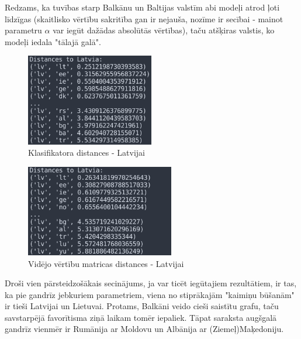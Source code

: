 \documentclass[12pt, a4paper]{article}
\begin{document}
Redzams, ka tuvības starp Balkānu un Baltijas valstīm abi modeļi atrod ļoti līdzīgas (skaitlisko vērtību sakritība gan ir nejauša, nozīme ir secībai - mainot parametru $\alpha$ var iegūt dažādas absolūtās vērtības), taču atšķiras valstis, ko modeļi iedala "tālajā galā".

\begin{figure}[h!]
    \centering
    \includegraphics[height=4cm,page=1]{close-far-lv-classifier.png}
    \caption{Klasifikatora distances - Latvijai}
\end{figure}
\begin{figure}[h!]
    \centering
    \includegraphics[height=4cm,page=1]{close-far-lv-model.png}
    \caption{Vidējo vērtību matricas distances - Latvijai}
\end{figure}

Droši vien pārsteidzošākais secinājums, ja var ticēt iegūtajiem rezultātiem, ir tas, ka pie gandrīz jebkuriem parametriem, viena no stiprākajām "kaimiņu būšanām" ir tieši Latvijai un Lietuvai. Protams, Balkāni veido cieši saistītu grafu, taču savstarpējā favorītisma ziņā laikam tomēr iepaliek. Tāpat saraksta augšgalā gandrīz vienmēr ir Rumānija ar Moldovu un Albānija ar (Ziemeļ)Maķedoniju.
\end{document}
